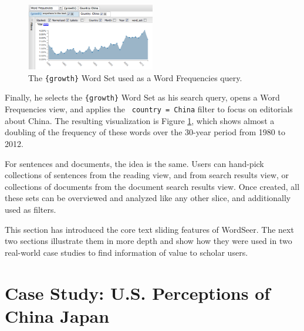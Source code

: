 \documentclass{sig-alternate}
\newcommand{\code}[1] {\texttt{#1}}
\begin{document}
\begin{figure}[ht!]
\begin{center}
	\includegraphics[width=0.5\textwidth]{fig/chris/04a.png}
\end{center}
    \caption{%
	The \code{\{growth\}} Word Set used as a Word Frequencies query.\label{fig:chris04a}
     }%
\end{figure}

Finally, he selects the  \code{\{growth\}} Word Set as his search query, opens a Word Frequencies view, and applies the \code{ country = China} filter to focus on editorials about China. The resulting visualization is Figure \ref{fig:chris04a}, which shows almost a doubling of the frequency of these words over the 30-year period from 1980 to 2012.

For sentences and documents, the idea is the same.  Users can hand-pick collections of sentences from the reading view, and from search results view, or collections of documents from the document search results view.  Once created, all these sets can be overviewed and analyzed like any other slice, and additionally used as filters.

This section has introduced the core text sliding features of WordSeer.  The next two sections illustrate them in more depth and show how they were used in two real-world case studies to find information of value to scholar users.

\section{Case Study: U.S. Perceptions of\\China Japan}
\end{document}
